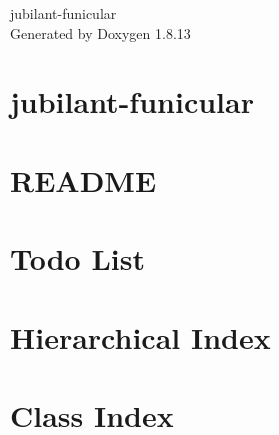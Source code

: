 \documentclass[twoside]{book}
\newcommand{\+}{\discretionary{\mbox{\scriptsize$\hookleftarrow$}}{}{}}
\newcommand{\clearemptydoublepage}{%
  \newpage{\pagestyle{empty}\cleardoublepage}%
}
\begin{document}
\hypersetup{pageanchor=false,
             bookmarksnumbered=true,
             pdfencoding=unicode
            }
\begin{titlepage}
\vspace*{7cm}
\begin{center}%
{\Large jubilant-\/funicular }\\
\vspace*{1cm}
{\large Generated by Doxygen 1.8.13}\\
\end{center}
\end{titlepage}
\clearemptydoublepage
{}
\tableofcontents
\clearemptydoublepage
{}
\hypersetup{pageanchor=true}

\chapter{jubilant-\/funicular}
\label{index}\hypertarget{index}{}
\chapter{R\+E\+A\+D\+ME}
\label{md_doxygen-theme_README}

\chapter{Todo List}
\label{todo}

\chapter{Hierarchical Index}

\chapter{Class Index}

\end{document}
